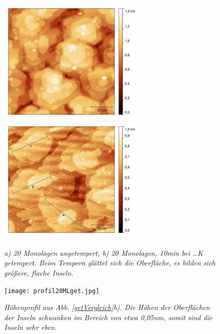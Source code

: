 \begin{figure}[htbp]
	\begin{minipage}[b]{0.5\textwidth} 
		\includegraphics[height=6cm]{20ML.jpg}
	\end{minipage}
	\hfill
	\begin{minipage}[b]{0.5\textwidth}
		\includegraphics[height=6cm]{20MLget2.jpg}
	\end{minipage}
	\caption{\textit{a) 20 Monolagen ungetempert, b) 20 Monolagen, 10min bei \ldots K getempert. Beim
	Tempern glättet sich die Oberfläche, es bilden sich größere, flache Inseln.}}
	\label{getVergleich} 
	\vfill
	\centering
		\texttt{[image: profil20MLget.jpg]}
	\caption{\textit{Höhenprofil aus Abb. \ref{getVergleich}b). Die Höhen der Oberflächen der Inseln
	schwanken im Bereich von etwa 0,05nm, somit sind die Inseln sehr eben.}}
	\label{profil20MLget}
\end{figure}
